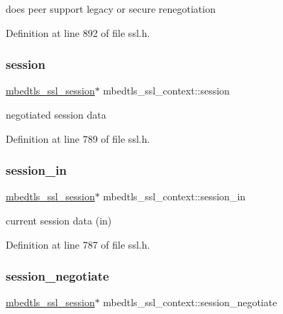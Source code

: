 does peer support legacy or secure renegotiation 

Definition at line 892 of file ssl.\+h.

\mbox{\label{structmbedtls__ssl__context_a2fc6ea9a1b644ee70bada085f89e3746}} 
\subsubsection{\texorpdfstring{session}{session}}
{\footnotesize\ttfamily \mbox{\hyperlink{structmbedtls__ssl__session}{mbedtls\+\_\+ssl\+\_\+session}}$\ast$ mbedtls\+\_\+ssl\+\_\+context\+::session}

negotiated session data 

Definition at line 789 of file ssl.\+h.

\mbox{\label{structmbedtls__ssl__context_a1a54dc6c582580371e94af230077dec1}} 
\subsubsection{\texorpdfstring{session\+\_\+in}{session\_in}}
{\footnotesize\ttfamily \mbox{\hyperlink{structmbedtls__ssl__session}{mbedtls\+\_\+ssl\+\_\+session}}$\ast$ mbedtls\+\_\+ssl\+\_\+context\+::session\+\_\+in}

current session data (in) 

Definition at line 787 of file ssl.\+h.

\mbox{\label{structmbedtls__ssl__context_a73ef7682bfa0827d71b5788c5724e718}} 
\subsubsection{\texorpdfstring{session\+\_\+negotiate}{session\_negotiate}}
{\footnotesize\ttfamily \mbox{\hyperlink{structmbedtls__ssl__session}{mbedtls\+\_\+ssl\+\_\+session}}$\ast$ mbedtls\+\_\+ssl\+\_\+context\+::session\+\_\+negotiate}

